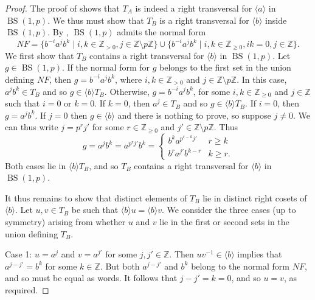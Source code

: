 \documentclass[11pt]{amsart}
\theoremstyle{definition}
\numberwithin{theorem}{section}
\DeclareMathOperator{\BS}{BS}
\newcommand{\Z}{\mathbb{Z}}
\begin{document}
\begin{proof}
	The proof of \cite[Lemma
	3.1]{almost-1rel-DP} shows that \(T_A\) is indeed a right transversal for
	\(\langle a \rangle\) in \(\BS(1, p)\).
	We thus must show that \(T_B\) is a right transversal for \(\langle b
	\rangle\) inside \(\BS(1, p)\). By \cite[Section~2]{BurilloElder}, \(\BS(1,
	p)\) admits the normal form
		\[
				NF = \{ b^{-i} a^j b^k \mid i, k \in \Z_{> 0}, j \in \Z \setminus p\Z \} 
				\cup \{b^{-i} a^j b^k \mid i, k \in \Z_{\geq 0}, ik = 0, j \in \Z\}.
		\]
		We first show that \(T_B\) contains a right transversal for
				\(\langle b \rangle\) in \(\BS(1, p)\). Let \(g \in \BS(1, p)\). If
				the normal form for \(g\) belongs to the first set in the union defining
				\(NF\), then \(g = b^{-i} a^j b^k\), where \(i, k \in \Z_{> 0}\) and
				\(j \in \Z \setminus p\Z\). In this case, \(a^j b^k \in T_B\) and so
				\(g \in \langle b \rangle T_B\). Otherwise, \(g = b^{-i} a^j b^k\), for
				some \(i, k \in \Z_{\geq 0}\) and \(j \in \Z\) such that \(i = 0\) or
				\(k = 0\). If \(k = 0\), then \(a^j \in T_B\) and so \(g \in \langle
				b \rangle T_B\). If \(i = 0\), then \(g = a^j b^k\). If \(j = 0\) then
				\(g \in \langle b \rangle\) and there is nothing to prove, so suppose
				\(j \neq 0\). We can thus write 
				\(j = p^r j'\) for some \(r \in \Z_{\geq 0}\) and \(j' \in \Z \setminus p\Z\).
				Thus \[
						g = a^j b^k = a^{p^rj'} b^k =
						\begin{cases}
							b^k a^{p^{r - k} j'} & r \geq k \\
							b^r a^{j'} b^{k - r} & k \geq r.
						\end{cases}
					\]
				Both cases lie in \(\langle b \rangle T_B\), and so \(T_B\) contains
				a right transversal for \(\langle b \rangle\) in \(\BS(1, p)\).
		
				It thus
		remains to show that distinct elements of \(T_B\) lie in distinct right
		cosets of \(\langle b \rangle\). Let \(u, v \in T_B\) be such that
		\(\langle b \rangle u = \langle b \rangle v\). We consider the three
		cases (up to symmetry) arising from whether \(u\) and \(v\) lie in the
		first or second sets in the union defining \(T_B\). 

		Case 1: \(u = a^j\) and \(v = a^{j'}\) for some \(j, j' \in \Z\). Then
		\(uv^{-1} \in \langle b \rangle\) implies that \(a^{j - j'} = b^k\)
		for some \(k \in \Z\). But both \(a^{j - j'}\) and \(b^k\) belong to
		the normal form \(NF\), and so must be equal as words. It
		follows that \(j - j' = k = 0\), and so \(u = v\), as required.


\end{proof}
\end{document}
